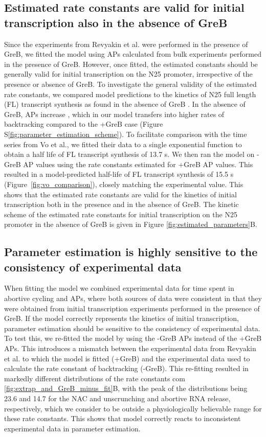 \subsection{Estimated rate constants are valid for initial transcription also
in the absence of GreB}
Since the experiments from Revyakin et al. were performed in the presence of
GreB, we fitted the model using APs calculated from bulk experiments performed
in the presence of GreB. However, once fitted, the estimated constants should
be generally valid for initial transcription on the N25 promoter, irrespective
of the presence or absence of GreB. To investigate the general validity of the
estimated rate constants, we compared model predictions to the kinetics of N25
full length (FL) transcript synthesis as found in the absence of GreB
\cite{vo_vitro_2003-1}. In the absence of GreB, APs increase
\cite{hsu_initial_2006}, which in our model transfers into higher rates of
backtracking compared to the +GreB case (Figure
S\ref{fig:parameter_estimation_scheme}). To facilitate comparison with the
time series from Vo et al., we fitted their data to a single exponential
function to obtain a half life of FL transcript synthesis of 13.7 s. We then
ran the model on -GreB AP values using the rate constants estimated for +GreB
AP values. This resulted in a model-predicted half-life of FL transcript
synthesis of 15.5 s (Figure~\ref{fig:vo_comparison}), closely matching the
experimental value. This shows that the estimated rate constants are valid for
the kinetics of initial transcription both in the presence and in the absence
of GreB. The kinetic scheme of the estimated rate constants for initial
transcription on the N25 promoter in the absence of GreB is given in Figure
\ref{fig:estimated_parameters}B.

\subsection{Parameter estimation is highly sensitive to the consistency of experimental data}
When fitting the model we combined experimental data for time spent in
abortive cycling and APs, where both sources of data were consistent in that
they were obtained from initial transcription experiments performed in the
presence of GreB. If the model correctly represents the kinetics of initial
transcription, parameter estimation should be sensitive to the consistency of
experimental data. To test this, we re-fitted the model by using the -GreB APs
instead of the +GreB APs. This introduces a mismatch between the experimental
data from Revyakin et al. to which the model is fitted (+GreB) and the
experimental data used to calculate the rate constant of backtracking (-GreB).
This re-fitting resulted in markedly different distributions of the rate
constants com \ref{fig:extrap_and_GreB_minus_fit}B, with the peak of the
distributions being 23.6 and 14.7 for the NAC and unscrunching and abortive
RNA release, respectively, which we consider to be outside a physiologically
believable range for these rate constants. This shows that model correctly
reacts to inconsistent experimental data in parameter estimation.


